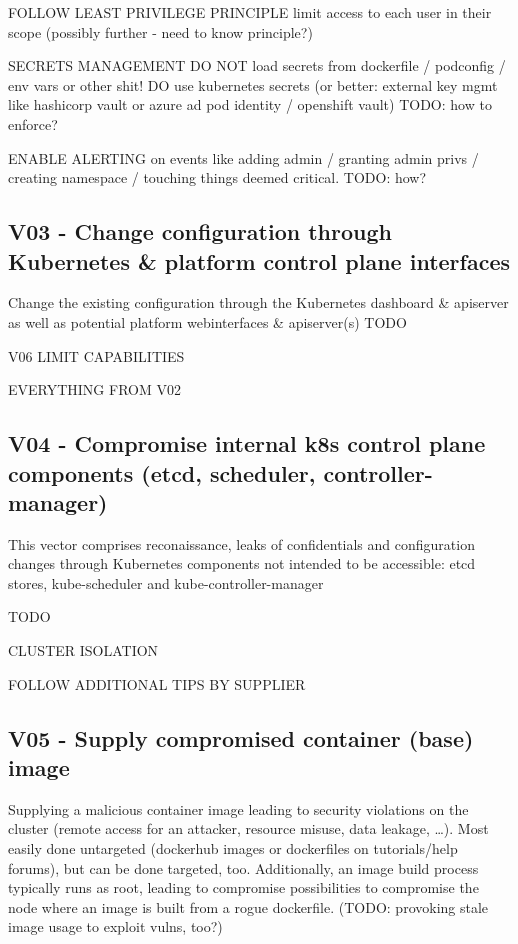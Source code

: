 FOLLOW LEAST PRIVILEGE PRINCIPLE
	limit access to each user in their scope (possibly further - need to know principle?)
	
SECRETS MANAGEMENT
	DO NOT load secrets from dockerfile / podconfig / env vars or other shit! DO use kubernetes secrets (or better: external key mgmt like hashicorp vault or azure ad pod identity / openshift vault) TODO: how to enforce?
	
ENABLE ALERTING
	on events like adding admin / granting admin privs / creating namespace / touching things deemed critical. TODO: how?

\subsection{V03 - Change configuration through Kubernetes \& platform control plane interfaces}
Change the existing configuration through the Kubernetes dashboard \& apiserver as well as potential platform webinterfaces \& apiserver(s)
TODO

V06 LIMIT CAPABILITIES

EVERYTHING FROM V02

\subsection{V04 - Compromise internal k8s control plane components (etcd, scheduler, controller-manager)}
This vector comprises reconaissance, leaks of confidentials and configuration changes through Kubernetes components not intended to be accessible: etcd stores, kube-scheduler and kube-controller-manager

TODO

CLUSTER ISOLATION

FOLLOW ADDITIONAL TIPS BY SUPPLIER


\subsection{V05 - Supply compromised container (base) image}
Supplying a malicious container image leading to security violations on the cluster (remote access for an attacker, resource misuse, data leakage, …). Most easily done untargeted (dockerhub images or dockerfiles on tutorials/help forums), but can be done targeted, too. Additionally, an image build process typically runs as root, leading to compromise possibilities to compromise the node where an image is built from a rogue dockerfile. (TODO: provoking stale image usage to exploit vulns, too?)

